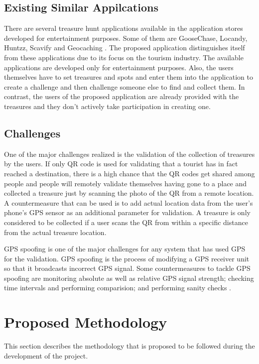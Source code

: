 \documentclass[12pt, a4paper, oneside]{article}
\begin{document}
\subsection{Existing Similar Appilcations}
There are several treasure hunt applications available in the application stores developed for entertainment purposes. Some of them are GooseChase, Locandy, Huntzz, Scavify and Geocaching \cite{similarapps}. The proposed application distinguishes itself from these applications due to its focus on the tourism industry. The available applications are developed only for entertainment purposes. Also, the users themselves have to set treasures and spots and enter them into the application to create a challenge and then challenge someone else to find and collect them. In contrast, the users of the proposed application are already provided with the treasures and they don't actively take participation in creating one.

\subsection{Challenges}
One of the major challenges realized is the validation of the collection of treasures by the users. If only QR code is used for validating that a tourist has in fact reached a destination, there is a high chance that the QR codes get shared among people and people will remotely validate themselves having gone to a place and collected a treasure just by scanning the photo of the QR from a remote location. A countermeasure that can be used is to add actual location data from the user's phone's GPS sensor as an additional parameter for validation. A treasure is only considered to be collected if a user scans the QR from within a specific distance from the actual treasure location.

GPS spoofing is one of the major challenges for any system that has used GPS for the validation. GPS spoofing is the process of modifying a GPS receiver unit so that it broadcasts incorrect GPS signal. Some countermeasures to tackle GPS spoofing are monitoring absolute as well as relative GPS signal strength; checking time intervals and performing comparision; and performing sanity checks \cite{gpsspoofmeasures}.

\break
\section{Proposed Methodology}
This section describes the methodology that is proposed to be followed during the development of the project.
\end{document}
